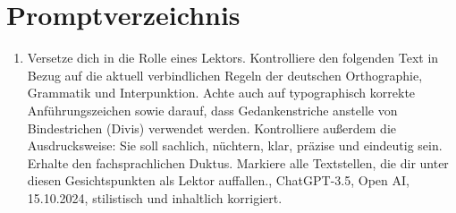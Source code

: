 \chapter*{Promptverzeichnis}
\label{sec:promptverzeichnis}

\begin{enumerate}
\item \glqq Versetze dich in die Rolle eines Lektors. Kontrolliere den folgenden Text in Bezug auf die aktuell verbindlichen Regeln der deutschen Orthographie, Grammatik und Interpunktion. Achte auch auf typographisch korrekte Anführungszeichen sowie darauf, dass Gedankenstriche anstelle von Bindestrichen (Divis) verwendet werden. Kontrolliere außerdem die Ausdrucksweise: Sie soll sachlich, nüchtern, klar, präzise und eindeutig sein. Erhalte den fachsprachlichen Duktus. Markiere alle Textstellen, die dir unter diesen Gesichtspunkten als Lektor auffallen.\grqq{}, ChatGPT-3.5, Open AI, 15.10.2024, stilistisch und inhaltlich korrigiert.
\end{enumerate}